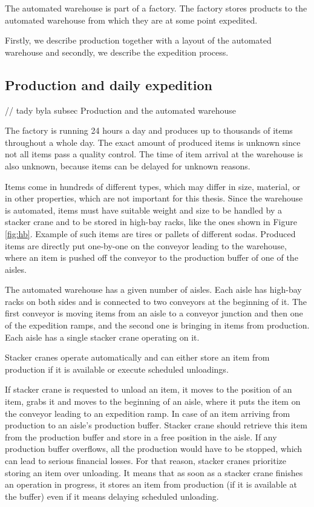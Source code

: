 \documentclass{ctuthesis}
\begin{document}
The automated warehouse is part of a factory. The factory stores products to the automated warehouse from which they are at some point expedited. 

Firstly, we describe production together with a layout of the automated warehouse and secondly, we describe the expedition process.

\subsection{Production and daily expedition} 
// tady byla subsec Production and the automated warehouse

The factory is running 24 hours a day and produces up to thousands of items throughout a whole day. The exact amount of produced items is unknown since not all items pass a quality control. The time of item arrival at the warehouse is also unknown, because items can be delayed for unknown reasons.

Items come in hundreds of different types, which may differ in size, material, or in other properties, which are not important for this thesis. Since the warehouse is automated, items must have suitable weight and size to be handled by a stacker crane and to be stored in high-bay racks, like the ones shown in Figure \ref{fig:hb}. Example of such items are tires or pallets of different sodas. Produced items are directly put one-by-one on the conveyor leading to the warehouse, where an item is pushed off the conveyor to the production buffer of one of the aisles.

The automated warehouse has a given number of aisles. Each aisle has high-bay racks on both sides and is connected to two conveyors at the beginning of it. The first conveyor is moving items from an aisle to a conveyor junction and then one of the expedition ramps, and the second one is bringing in items from production. Each aisle has a single stacker crane operating on it.

Stacker cranes operate automatically and can either store an item from production if it is available or execute scheduled unloadings. 

If stacker crane is requested to unload an item, it moves to the position of an item, grabs it and moves to the beginning of an aisle, where it puts the item on the conveyor leading to an expedition ramp. In case of an item arriving from production to an aisle's production buffer. Stacker crane should retrieve this item from the production buffer and store in a free position in the aisle. If any production buffer overflows, all the production would have to be stopped, which can lead to serious financial losses. For that reason, stacker cranes prioritize storing an item over unloading. It means that as soon as a stacker crane finishes an operation in progress, it stores an item from production (if it is available at the buffer) even if it means delaying scheduled unloading.
\end{document}

